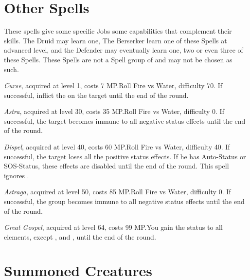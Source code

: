 \section{Other Spells}\label{sec:magic-other}
\begin{multicols}{2}

    These spells give some specific Jobs some capabilities that complement their skills. The Druid may learn one, The Berserker learn one of these Spells at advanced level, and the Defender may eventually learn one, two or even three of these Spells. These Spells are not a Spell group of and may not be chosen as such.
    
    \textit{Curse}, acquired at level 1, costs 7 MP.\@{}Roll Fire vs Water, difficulty 70. If successful, inflict the  on the target until the end of the round.

    \textit{Astra}, acquired at level 30, costs 35 MP.\@{}Roll Fire vs Water, difficulty 0. If successful, the target becomes immune to all negative status effects until the end of the round.
    
    \textit{Dispel}, acquired at level 40, costs 60 MP.\@{}Roll Fire vs Water, difficulty 40. If successful, the target loses all the positive status effects. If he has Auto-Status or SOS-Status, these effects are disabled until the end of the round. This spell ignores .
    
    \textit{Astraga}, acquired at level 50, costs 85 MP.\@{}Roll Fire vs Water, difficulty 0. If successful, the group becomes immune to all negative status effects until the end of the round.
    
    \textit{Great Gospel}, acquired at level 64, costs 99 MP.\@{}You gain the  status to all elements, except ,  and , until the end of the round.	

\end{multicols}

\section{Summoned Creatures}\label{sec:magic-summoned}

